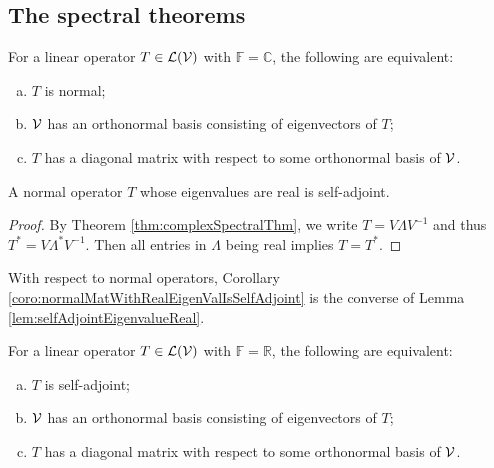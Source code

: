 \subsection{The spectral theorems}
\label{sec:spectral-theorem}

\begin{thm}
  \label{thm:complexSpectralThm}
  For a linear operator $T\in {\cal L}({\cal V})$
  with $\mathbb{F}=\mathbb{C}$, 
  the following are equivalent:
  \begin{enumerate}[(a)]\itemsep0em
  \item $T$ is normal;
  \item ${\cal V}$ has an orthonormal basis consisting of eigenvectors of
    $T$;
  \item $T$ has a diagonal matrix with respect
    to some orthonormal basis of ${\cal V}$.
  \end{enumerate}
\end{thm}

\begin{coro}
  \label{coro:normalMatWithRealEigenValIsSelfAdjoint}
  A normal operator $T$ whose eigenvalues are real is self-adjoint.
\end{coro}
\begin{proof}
  By Theorem \ref{thm:complexSpectralThm},
  we write $T=V\Lambda V^{-1}$
  and thus $T^*=V \Lambda^* V^{-1}$.
  Then all entries in $\Lambda$ being real
  implies $T=T^*$.
\end{proof}

\begin{rem}
  With respect to normal operators, 
  Corollary \ref{coro:normalMatWithRealEigenValIsSelfAdjoint}
  is the converse of
  Lemma \ref{lem:selfAdjointEigenvalueReal}.
\end{rem}

\begin{thm}
  \label{thm:realSpectralThm}
  For a linear operator $T\in {\cal L}({\cal V})$
  with $\mathbb{F}=\mathbb{R}$, 
  the following are equivalent:
  \begin{enumerate}[(a)]\itemsep0em
  \item $T$ is self-adjoint;
  \item ${\cal V}$ has an orthonormal basis consisting of eigenvectors of
    $T$;
  \item $T$ has a diagonal matrix with respect
    to some orthonormal basis of ${\cal V}$.
  \end{enumerate}
\end{thm}

